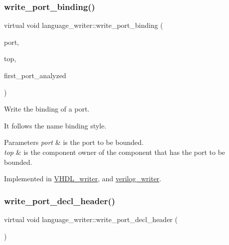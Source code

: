 \subsubsection{\texorpdfstring{write\+\_\+port\+\_\+binding()}{write\_port\_binding()}}
{\footnotesize\ttfamily virtual void language\+\_\+writer\+::write\+\_\+port\+\_\+binding (\begin{DoxyParamCaption}\item[{const \hyperlink{structural__objects_8hpp_a8ea5f8cc50ab8f4c31e2751074ff60b2}{structural\+\_\+object\+Ref} \&}]{port,  }\item[{const \hyperlink{structural__objects_8hpp_a8ea5f8cc50ab8f4c31e2751074ff60b2}{structural\+\_\+object\+Ref} \&}]{top,  }\item[{bool \&}]{first\+\_\+port\+\_\+analyzed }\end{DoxyParamCaption})\hspace{0.3cm}{\ttfamily [pure virtual]}}



Write the binding of a port. 

It follows the name binding style. 
\begin{DoxyParams}{Parameters}
{\em port} & is the port to be bounded. \\
\hline
{\em top} & is the component owner of the component that has the port to be bounded. \\
\hline
\end{DoxyParams}


Implemented in \hyperlink{structVHDL__writer_ab460a8caf690d621561c8ea8705d7438}{V\+H\+D\+L\+\_\+writer}, and \hyperlink{classverilog__writer_a6c09eb18456ab75a1086e45ec464cae8}{verilog\+\_\+writer}.

\mbox{\label{classlanguage__writer_a89c790a77df81030bd359a1adcaae433}} 
\subsubsection{\texorpdfstring{write\+\_\+port\+\_\+decl\+\_\+header()}{write\_port\_decl\_header()}}
{\footnotesize\ttfamily virtual void language\+\_\+writer\+::write\+\_\+port\+\_\+decl\+\_\+header (\begin{DoxyParamCaption}{ }\end{DoxyParamCaption})\hspace{0.3cm}{\ttfamily [pure virtual]}}



